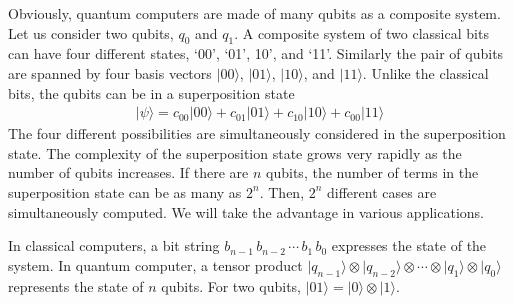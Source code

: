 \documentclass[letterpaper,10pt,english]{jupyterBook}
\begin{document}
\sphinxAtStartPar
Obviously, quantum computers are made of many qubits as a composite system. Let us consider two qubits, \(q_0\) and \(q_1\).  A composite system of two classical bits can have four different states, ‘00’, ‘01’, 10’, and ‘11’.  Similarly  the pair of qubits are spanned by four basis vectors \(\lvert 00 \rangle\), \(\lvert 01 \rangle\), \(\lvert 10 \rangle\), and \(\lvert 11 \rangle\).  Unlike the classical bits, the qubits can be in a superposition state
\begin{equation*}
\begin{split}
\lvert \psi \rangle = c_{00} \lvert 00 \rangle + c_{01} \lvert 01 \rangle + c_{10} \lvert 10 \rangle + c_{00} \lvert 11 \rangle
\end{split}
\end{equation*}
\sphinxAtStartPar
The four different possibilities are simultaneously considered in the superposition state. The complexity of the superposition state grows very rapidly as the number of qubits increases.  If there are \(n\) qubits, the number of terms in the superposition state can be as many as \(2^n\).   Then, \(2^n\) different cases are simultaneously computed. We will take the advantage in various applications.

\sphinxAtStartPar
In classical computers,  a bit string \(b_{n-1}\, b_{n-2}\,\cdots\, b_1\, b_0\) expresses the state of the system.  In quantum computer, a tensor product \(\lvert q_{n-1} \rangle \otimes \lvert q_{n-2}\rangle \otimes \cdots \otimes \lvert q_1 \rangle \otimes \lvert q_0 \rangle\) represents the state of \(n\) qubits.  For two qubits, \(\lvert 01 \rangle = \lvert 0 \rangle \otimes \lvert 1 \rangle\).
\end{document}
